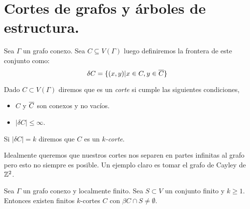\documentclass[tesis.tex]{subfiles}
\begin{document}
\section{Cortes de grafos y árboles de estructura.}

\begin{deff}
	Sea $\Gamma$ un grafo conexo. 
	Sea $C \subseteq V(\Gamma)$ luego definiremos la frontera de este conjunto como:	
	\[
	\delta C = \{  (x,y) | x \in C, y \in \overline C    \}
	\]
\end{deff}


\begin{deff}
	Dado $C \subset V(\Gamma)$ diremos que es un \emph{corte} si cumple las siguientes condiciones,
	\begin{itemize}
		\item $C$ y $\overline C$ son conexos y no vacíos.
		\item $|\delta C| \le \infty$.
	\end{itemize}
	Si $|\delta C| = k$ diremos que $C$ es un \emph{$k$-corte}.
\end{deff}	

Idealmente queremos que nuestros cortes nos separen en partes infinitas al grafo pero esto no siempre es posible.
Un ejemplo claro es tomar el grafo de Cayley de $\mathbb{Z}^2$.
	
\begin{lema}\label{lema_finitos_kcortes}
	Sea $\Gamma$ un grafo conexo y localmente finito.
	Sea $S \subset V$ un conjunto finito y $k\ge 1$.
	Entonces existen finitos $k$-cortes $C$ con $\beta C \cap S \neq \emptyset$.
\end{lema}	
\end{document}
